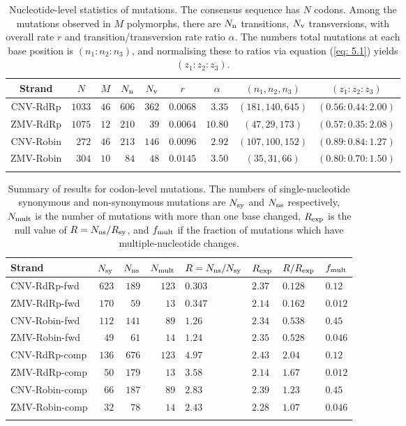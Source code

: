 \documentclass[unnumsec,webpdf,contemporary,large,namedate]{oup-authoring-template}%
\theoremstyle{thmstyleone}%
\theoremstyle{thmstyletwo}%
\theoremstyle{thmstylethree}%
\begin{document}
\begin{table}
\caption{
Nucleotide-level statistics of mutations. The consensus sequence has $N$ codons. Among the mutations 
observed in $M$ polymorphs, there are $N_{\rm n}$ transitions, $N_{\rm v}$ transversions, with overall 
rate $r$ and transition/transversion rate ratio $\alpha$. The numbers total mutations at each base position 
is $(n_1:n_2:n_3)$, and normalising these to ratios via equation (\ref{eq: 5.1}) yields $(z_1:z_2:z_3)$.
\label{tab: 5.1}}
\begin{tabular*}{\textwidth}{@{\extracolsep\fill}crcrrcrcc@{\extracolsep\fill}}
\toprule
Strand&\multicolumn{1}{c}{$N$}&$M$&\multicolumn{1}{c}{$N_{\rm n}$}&\multicolumn{1}{c}{$N_{\rm v}$}
&$r$&\multicolumn{1}{c}{$\alpha$}&$(n_1,n_2,n_3)$&$(z_1:z_2:z_3)$\\
\midrule
CNV-RdRp&$1033$  &$46$ &$606$ &$362$&$0.0068$&$3.35$ &$(181,140,645)$&$(0.56:0.44:2.00)$\\
ZMV-RdRp&$1075$ &$12$&$210$ &$39$& $0.0064$ &$10.80$ &$(47,29,173)$&$(0.57:0.35:2.08)$\\
CNV-Robin&$272$    &$46$ &$213$ &$146$&$0.0096$&$2.92$ &$(107,100,152)$&$(0.89:0.84:1.27)$\\
ZMV-Robin&$304$&$10$&$84$&$48$&$0.0145$&$3.50$&$(35,31,66)$&$(0.80:0.70:1.50)$\\
\botrule
\end{tabular*}
\end{table}

\begin{table}
\caption{
Summary of results for codon-level mutations. 
The numbers of single-nucleotide synonymous and 
non-synonymous mutations are $N_{\rm sy}$ and $N_{\rm ns}$ respectively, $N_{\rm mult}$ is the number 
of mutations with more than one base changed, $R_{\rm exp}$ is the null value of $R=N_{\rm ns}/R_{\rm sy}$, 
and $f_{\rm mult}$ if the fraction of mutations which have multiple-nucleotide changes.
\label{tab: 5.2}}
\begin{tabular*}{\textwidth}{@{\extracolsep\fill}lrrrllll@{\extracolsep\fill}}
\toprule
Strand&$N_{\rm sy}$&$N_{\rm ns}$&$N_{\rm mult}$&$R=N_{\rm ns}/N_{\rm sy}$&$R_{\rm exp}$
&$R/R_{\rm exp}$&$f_{\rm mult}$\\
\midrule
CNV-RdRp-fwd   &$623$ &$189$ & $123$ &$0.303$ &$2.37$&$0.128$&$0.12$\\
ZMV-RdRp-fwd   &$170$ &$59$ & $13$ &$0.347$ &$2.14$&$0.162$&$0.012$\\
CNV-Robin-fwd   &$112$&$141$& $89$   &$1.26$ & $2.34$&$0.538$&$0.45$\\
ZMV-Robin-fwd   &$49$&$61$& $14$   &$1.24$ & $2.35$&$0.528$&$0.046$\\
CNV-RdRp-comp &$136$&$676$& $123$ &$4.97$ &$2.43$&$2.04$&$0.12$\\
ZMV-RdRp-comp &$50$&$179$& $13$ &$3.58$ &$2.14$&$1.67$&$0.012$\\
CNV-Robin-comp &$66$&$187$&$89$&$2.83$&$2.39$&$1.23$&$0.45$\\
ZMV-Robin-comp &$32$&$78$&$14$&$2.43$&$2.28$&$1.07$&$0.046$\\
\botrule
\end{tabular*}
\end{table}
\end{document}
